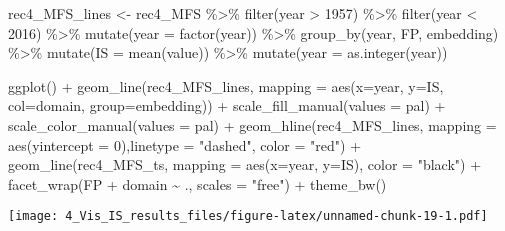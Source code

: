 \documentclass[
]{article}
\newenvironment{Shaded}{\begin{snugshade}}{\end{snugshade}}
\newcommand{\AttributeTok}[1]{\textcolor[rgb]{0.77,0.63,0.00}{#1}}
\newcommand{\DecValTok}[1]{\textcolor[rgb]{0.00,0.00,0.81}{#1}}
\newcommand{\FunctionTok}[1]{\textcolor[rgb]{0.00,0.00,0.00}{#1}}
\newcommand{\NormalTok}[1]{#1}
\newcommand{\OtherTok}[1]{\textcolor[rgb]{0.56,0.35,0.01}{#1}}
\newcommand{\SpecialCharTok}[1]{\textcolor[rgb]{0.00,0.00,0.00}{#1}}
\newcommand{\StringTok}[1]{\textcolor[rgb]{0.31,0.60,0.02}{#1}}
\begin{document}
\begin{Shaded}
\begin{Highlighting}[]
\NormalTok{rec4\_MFS\_lines }\OtherTok{\textless{}{-}}\NormalTok{ rec4\_MFS }\SpecialCharTok{\%\textgreater{}\%} 
  \FunctionTok{filter}\NormalTok{(year }\SpecialCharTok{\textgreater{}} \DecValTok{1957}\NormalTok{) }\SpecialCharTok{\%\textgreater{}\%}
  \FunctionTok{filter}\NormalTok{(year }\SpecialCharTok{\textless{}} \DecValTok{2016}\NormalTok{) }\SpecialCharTok{\%\textgreater{}\%} 
  \FunctionTok{mutate}\NormalTok{(}\AttributeTok{year =} \FunctionTok{factor}\NormalTok{(year)) }\SpecialCharTok{\%\textgreater{}\%} 
  \FunctionTok{group\_by}\NormalTok{(year, FP, embedding) }\SpecialCharTok{\%\textgreater{}\%} 
  \FunctionTok{mutate}\NormalTok{(}\AttributeTok{IS =} \FunctionTok{mean}\NormalTok{(value)) }\SpecialCharTok{\%\textgreater{}\%} 
  \FunctionTok{mutate}\NormalTok{(}\AttributeTok{year =} \FunctionTok{as.integer}\NormalTok{(year))}


\FunctionTok{ggplot}\NormalTok{() }\SpecialCharTok{+}
  \FunctionTok{geom\_line}\NormalTok{(rec4\_MFS\_lines, }\AttributeTok{mapping =} \FunctionTok{aes}\NormalTok{(}\AttributeTok{x=}\NormalTok{year, }\AttributeTok{y=}\NormalTok{IS, }\AttributeTok{col=}\NormalTok{domain, }\AttributeTok{group=}\NormalTok{embedding)) }\SpecialCharTok{+} 
  \FunctionTok{scale\_fill\_manual}\NormalTok{(}\AttributeTok{values =}\NormalTok{ pal) }\SpecialCharTok{+}
  \FunctionTok{scale\_color\_manual}\NormalTok{(}\AttributeTok{values =}\NormalTok{ pal) }\SpecialCharTok{+}
  \FunctionTok{geom\_hline}\NormalTok{(rec4\_MFS\_lines, }\AttributeTok{mapping =} \FunctionTok{aes}\NormalTok{(}\AttributeTok{yintercept =} \DecValTok{0}\NormalTok{),}\AttributeTok{linetype =} \StringTok{"dashed"}\NormalTok{, }\AttributeTok{color =} \StringTok{"red"}\NormalTok{) }\SpecialCharTok{+}
  \FunctionTok{geom\_line}\NormalTok{(rec4\_MFS\_ts, }\AttributeTok{mapping =} \FunctionTok{aes}\NormalTok{(}\AttributeTok{x=}\NormalTok{year, }\AttributeTok{y=}\NormalTok{IS), }\AttributeTok{color =} \StringTok{"black"}\NormalTok{) }\SpecialCharTok{+}
  \FunctionTok{facet\_wrap}\NormalTok{(FP }\SpecialCharTok{+}\NormalTok{ domain }\SpecialCharTok{\textasciitilde{}}\NormalTok{ ., }\AttributeTok{scales =} \StringTok{"free"}\NormalTok{) }\SpecialCharTok{+}
  \FunctionTok{theme\_bw}\NormalTok{()}
\end{Highlighting}
\end{Shaded}

\texttt{[image: 4\_Vis\_IS\_results\_files/figure-latex/unnamed-chunk-19-1.pdf]}
\end{document}
